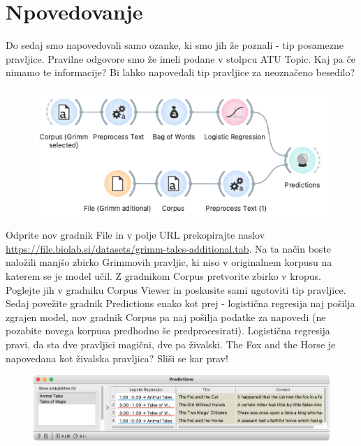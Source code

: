 \chapter{Npovedovanje}
\label{ch:text-napovedovanje}

Do sedaj smo napovedovali samo ozanke, ki smo jih že poznali - tip posamezne pravljice. Pravilne odgovore smo že imeli podane v stolpcu ATU Topic. Kaj pa če nimamo te informacije? Bi lahko napovedali tip pravljice za neoznačeno besedilo?

\begin{figure}[h]
    \includegraphics[width=\linewidth]{napovedovanje-workflow.png}%
    \caption{ }
    \label{fig:002-preprocess}
\end{figure}

Odprite nov gradnik File in v polje URL prekopirajte naslov \url{https://file.biolab.si/datasets/grimm-tales-additional.tab}. Na ta način boste naložili manjšo zbirko Grimmovih pravljic, ki niso v originalnem korpusu na katerem se je model učil. Z gradnikom Corpus pretvorite zbirko v kropus. Poglejte jih v gradniku Corpus Viewer in poskusite sami ugotoviti tip pravljice.
Sedaj povežite gradnik Predictions enako kot prej - logistična regresija naj pošilja zgrajen model, nov gradnik Corpus pa naj pošilja podatke za napovedi (ne pozabite novega korpusa predhodno še predprocesirati). Logistična regresija pravi, da sta dve pravljici magični, dve pa živalski.
The Fox and the Horse je napovedana kot živalska pravljica? Sliši se kar prav!

\begin{figure}[h]
    \centering
    \includegraphics[width=\linewidth]{napovedovanje-predictions.png}%
    \caption{}
    \label{fig:002-word-cloud}
\end{figure}